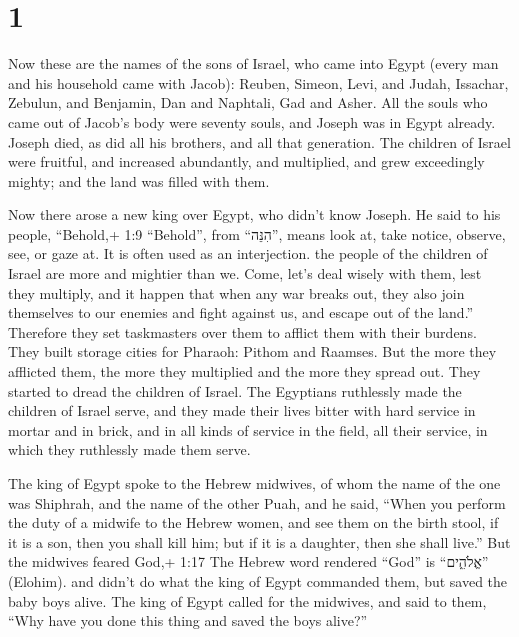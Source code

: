 \hypertarget{section}{%
\section{1}\label{section}}

 Now these are the names of the sons of Israel, who came
into Egypt (every man and his household came with Jacob): 
Reuben, Simeon, Levi, and Judah,  Issachar, Zebulun, and
Benjamin,  Dan and Naphtali, Gad and Asher.  All
the souls who came out of Jacob's body were seventy souls, and Joseph
was in Egypt already.  Joseph died, as did all his brothers,
and all that generation.  The children of Israel were
fruitful, and increased abundantly, and multiplied, and grew exceedingly
mighty; and the land was filled with them.

 Now there arose a new king over Egypt, who didn't know
Joseph.  He said to his people, ``Behold,+ 1:9 ``Behold'',
from ``הִנֵּה'', means look at, take notice, observe, see, or gaze at.
It is often used as an interjection. the people of the children of
Israel are more and mightier than we.  Come, let's deal
wisely with them, lest they multiply, and it happen that when any war
breaks out, they also join themselves to our enemies and fight against
us, and escape out of the land.''  Therefore they set
taskmasters over them to afflict them with their burdens. They built
storage cities for Pharaoh: Pithom and Raamses.  But the
more they afflicted them, the more they multiplied and the more they
spread out. They started to dread the children of Israel. 
The Egyptians ruthlessly made the children of Israel serve,
 and they made their lives bitter with hard service in
mortar and in brick, and in all kinds of service in the field, all their
service, in which they ruthlessly made them serve.

 The king of Egypt spoke to the Hebrew midwives, of whom
the name of the one was Shiphrah, and the name of the other Puah,
 and he said, ``When you perform the duty of a midwife to
the Hebrew women, and see them on the birth stool, if it is a son, then
you shall kill him; but if it is a daughter, then she shall live.''
 But the midwives feared God,+ 1:17 The Hebrew word
rendered ``God'' is ``אֱלֹהִ֑ים'' (Elohim). and didn't do what the king
of Egypt commanded them, but saved the baby boys alive. 
The king of Egypt called for the midwives, and said to them, ``Why have
you done this thing and saved the boys alive?''

